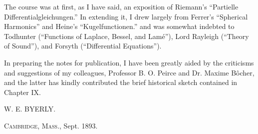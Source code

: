 \documentclass[oneside,12pt]{book}
\begin{document}
The course was at first, as I have said, an exposition of Riemann's ``Partielle Differentialgleichungen.'' In extending it, I drew largely from Ferrer's ``Spherical Harmonics'' and Heine's ``Kugelfunctionen.'' and was somewhat indebted to Todhunter (``Functions of Laplace, Bessel, and Lam\'e''), Lord Rayleigh (``Theory of Sound''), and Forsyth (``Differential Equations''). \par 

In preparing the notes for publication, I have been greatly aided by the criticisms and suggestions of my colleagues, Professor B. O. Peirce and Dr. Maxime B\^ocher, and the latter has kindly contributed the brief historical sketch contained in Chapter IX. \par 

\begin{flushright}
    W. E. BYERLY.
\end{flushright}
\textsc{Cambridge, Mass.,} Sept. 1893.
\end{document}
